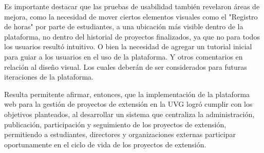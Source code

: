 Es importante destacar que las pruebas de usabilidad también revelaron áreas de mejora, como la necesidad de mover ciertos elementos
visuales como el "Registro de horas" por parte de estudiantes, a una ubicación más visible dentro de la plataforma, no dentro del
historial de proyectos finalizados, ya que no para todos los usuarios resultó intuitivo. O bien la necesidad de agregar un tutorial
inicial para guiar a los usuarios en el uso de la plataforma. Y otros comentarios en relación al diseño visual. Los cuales deberán
de ser considerados para futuras iteraciones de la plataforma.

Resulta permitente afirmar, entonces, que la implementación de la plataforma web para la gestión de proyectos de extensión en la
UVG logró cumplir con los objetivos planteados, al desarrollar un sistema que centraliza la administración, publicación, participación
y seguimiento de los proyectos de extensión, permitiendo a estudiantes, directores y organizaciones externas participar oportunamente
en el ciclo de vida de los proyectos de extensión. 